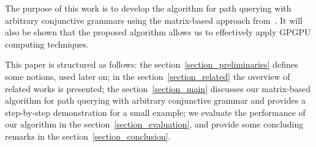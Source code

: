 The purpose of this work is to develop the algorithm
for path querying with arbitrary conjunctive grammars using the matrix-based approach from~\cite{azimov2018context}. It will also be shown that the proposed algorithm allows us to effectively apply GPGPU computing techniques.

This paper is structured as follows: the section~\ref{section_preliminaries} defines some notions, used later on; in the section~\ref{section_related} the overview of related works is presented; the section~\ref{section_main} discusses our matrix-based algorithm for path querying with arbitrary conjunctive grammar and provides a step-by-step demonstration for a small example;  we evaluate the performance of our algorithm in the section~\ref{section_evaluation}, and provide some concluding remarks in the section~\ref{section_conclusion}.
